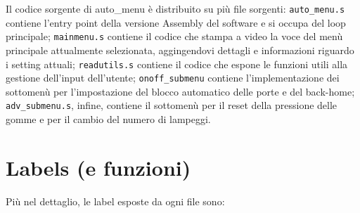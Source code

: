 \documentclass[
  12pt,
  a4paper,
  headings=optiontoheadandtoc
]{scrreprt}
\begin{document}
Il codice sorgente di auto\_menu è distribuito su più file sorgenti: \texttt{auto\_menu.s} contiene l'entry point della versione Assembly del software e si occupa del loop principale; \texttt{mainmenu.s} contiene il codice che stampa a video la voce del menù principale attualmente selezionata, aggingendovi dettagli e informazioni riguardo i setting attuali; \texttt{readutils.s} contiene il codice che espone le funzioni utili alla gestione dell'input dell'utente; \texttt{onoff\_submenu} contiene l'implementazione dei sottomenù per l'impostazione del blocco automatico delle porte e del back-home; \texttt{adv\_submenu.s}, infine, contiene il sottomenù per il reset della pressione delle gomme e per il cambio del numero di lampeggi.

\section[nonumber=true]{Labels (e funzioni)}

Più nel dettaglio, le label esposte da ogni file sono:
\end{document}

